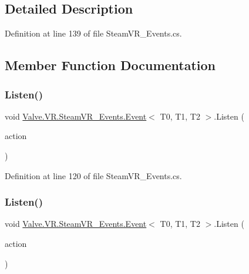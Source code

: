 \subsection{Detailed Description}


Definition at line 139 of file Steam\+V\+R\+\_\+\+Events.\+cs.



\subsection{Member Function Documentation}
\mbox{\label{class_valve_1_1_v_r_1_1_steam_v_r___events_1_1_event_aba909cc96e966145932d193aaa4b1e98}} 
\subsubsection{\texorpdfstring{Listen()}{Listen()}\hspace{0.1cm}{\footnotesize\ttfamily [1/4]}}
{\footnotesize\ttfamily void \mbox{\hyperlink{class_valve_1_1_v_r_1_1_steam_v_r___events_1_1_event}{Valve.\+V\+R.\+Steam\+V\+R\+\_\+\+Events.\+Event}}$<$ T0, T1, T2 $>$.Listen (\begin{DoxyParamCaption}\item[{Unity\+Action}]{action }\end{DoxyParamCaption})}



Definition at line 120 of file Steam\+V\+R\+\_\+\+Events.\+cs.

\mbox{\label{class_valve_1_1_v_r_1_1_steam_v_r___events_1_1_event_ae0c83128ec4757fc0d20e19de8a9be1d}} 
\subsubsection{\texorpdfstring{Listen()}{Listen()}\hspace{0.1cm}{\footnotesize\ttfamily [2/4]}}
{\footnotesize\ttfamily void \mbox{\hyperlink{class_valve_1_1_v_r_1_1_steam_v_r___events_1_1_event}{Valve.\+V\+R.\+Steam\+V\+R\+\_\+\+Events.\+Event}}$<$ T0, T1, T2 $>$.Listen (\begin{DoxyParamCaption}\item[{Unity\+Action$<$ T $>$}]{action }\end{DoxyParamCaption})}



